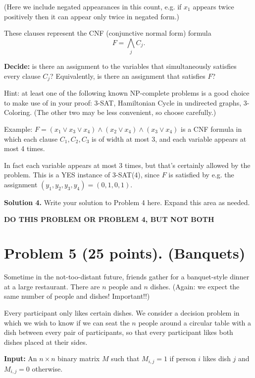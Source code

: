 \documentclass[12pt]{article}
\begin{document}
(Here we include negated appearances in this count, e.g. if $x_1$ appears twice positively then it can appear only twice in negated form.)

These clauses represent the CNF (conjunctive normal form) formula
\[
F=\bigwedge_j C_j.
\]

\noindent\textbf{Decide:} is there an assignment to the variables that simultaneously satisfies every clause $C_j$? Equivalently, is there an assignment that satisfies $F$?

Hint: at least one of the following known NP-complete problems is a good choice to make use of in your proof: 3-SAT, Hamiltonian Cycle in undirected graphs, 3-Coloring. (The other two may be less convenient, so choose carefully.)

Example: $F=(x_1\lor x_3\lor x_4)\land (x_2\lor x_4)\land (x_3\lor x_4)$ is a CNF formula in which each clause $C_1,C_2,C_3$ is of width at most 3, and each variable appears at most 4 times.

In fact each variable appears at most 3 times, but that's certainly allowed by the problem. This is a YES instance of 3-SAT(4), since $F$ is satisfied by e.g. the assignment $(y_1,y_2,y_3,y_4)=(0,1,0,1)$.

\vspace{1em}
\noindent\textbf{Solution 4.} Write your solution to Problem 4 here. Expand this area as needed.

\newpage

\begin{center}
\textbf{DO THIS PROBLEM OR PROBLEM 4, BUT NOT BOTH}
\end{center}

\section*{Problem 5 (25 points). (Banquets)}

Sometime in the not-too-distant future, friends gather for a banquet-style dinner at a large restaurant. There are $n$ people and $n$ dishes. (Again: we expect the same number of people and dishes! Important!!)

Every participant only likes certain dishes. We consider a decision problem in which we wish to know if we can seat the $n$ people around a circular table with a dish between every pair of participants, so that every participant likes both dishes placed at their sides.

\vspace{0.5em}
\noindent\textbf{Input:} An $n\times n$ binary matrix $M$ such that $M_{i,j}=1$ if person $i$ likes dish $j$ and $M_{i,j}=0$ otherwise.
\end{document}
